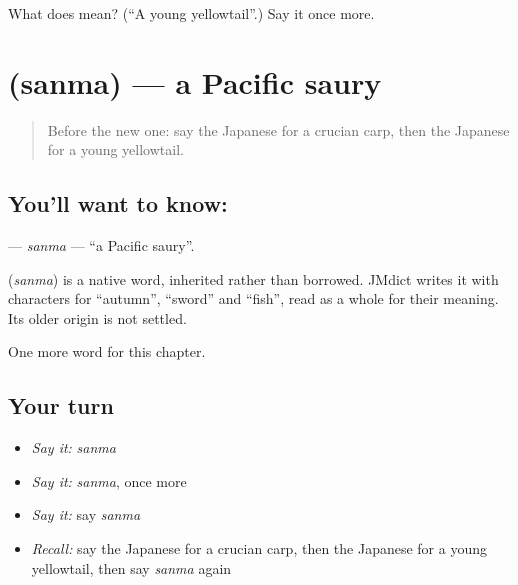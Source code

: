\begin{tcolorbox}[breakable,colback=teal!4,colframe=teal!35!black,title={Before you move on}]
What does  mean? (\textquotedblleft{}A young yellowtail\textquotedblright{}.) Say it once more.
\end{tcolorbox}
\section[\texorpdfstring{\ja{さんま} (sanma)}{さんま (sanma)}]{ (sanma) — a Pacific saury}

\label{lesson:JA-C116-sanma}



\begin{quote}
Before the new one: say the Japanese for a crucian carp, then the Japanese for a young yellowtail.
\end{quote}

\subsection*{You'll want to know: }
\textbf{} — \emph{sanma} — \textquotedblleft{}a Pacific saury\textquotedblright{}.

\begin{cousinweb}
\textbf{} (\emph{sanma}) is a native word, inherited rather than borrowed. JMdict writes it with characters for \textquotedblleft{}autumn\textquotedblright{}, \textquotedblleft{}sword\textquotedblright{} and \textquotedblleft{}fish\textquotedblright{}, read as a whole for their meaning. Its older origin is not settled.
\end{cousinweb}

\begin{grammarlens}[title={What you've built}]
One more word for this chapter.
\end{grammarlens}

\subsection*{Your turn}
\begin{itemize}
\raggedright
  \item \emph{Say it:} \emph{sanma}
  \item \emph{Say it:} \emph{sanma}, once more
  \item \emph{Say it:} say \emph{sanma}
  \item \emph{Recall:} say the Japanese for a crucian carp, then the Japanese for a young yellowtail, then say \emph{sanma} again
\end{itemize}


